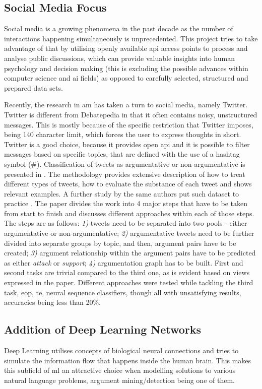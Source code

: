     \subsection{Social Media Focus} \label{socialmedia}
        Social media is a growing phenomena in the past decade as the number of interactions happening simultaneously is unprecedented. This project tries to take advantage of that by utilising openly available \gls{api} access points to process and analyse public discussions, which can provide valuable insights into human psychology and decision making (this is excluding the possible advances within computer science and \gls{ai} fields) as opposed to carefully selected, structured and prepared data sets.
    
        Recently, the research in \gls{am} has taken a turn to social media, namely Twitter. Twitter is different from Debatepedia in that it often contains noisy, unstructured messages. This is mostly because of the specific restriction that Twitter imposes, being 140 character limit, which forces the user to express thoughts in short. Twitter is a good choice, because it provides open \gls{api} and it is possible to filter messages based on specific topics, that are defined with the use of a hashtag symbol (\#). Classification of tweets as argumentative or non-argumentative is presented in \autocite{Bosc2016DARTAD}. The methodology provides extensive description of how to treat different types of tweets, how to evaluate the substance of each tweet and shows relevant examples. A further study by the same authors put such dataset to practice \autocite{Bosc2016TweetiesSP}. The paper divides the work into 4 major steps that have to be taken from start to finish and discusses different approaches within each of those steps. The steps are as follows: \textit{1)} tweets need to be separated into two pools - either argumentative or non-argumentative; \textit{2)} argumentative tweets need to be further divided into separate groups by topic, and then, argument pairs have to be created; \textit{3)} argument relationship within the argument pairs have to be predicted as either \textit{attack} or \textit{support}; \textit{4)} argumentation graph has to be built. First and second tasks are trivial compared to the third one, as is evident based on views expressed in the paper. Different approaches were tested while tackling the third task, \gls{eop}, \gls{te}, neural sequence classifiers, though all with unsatisfying results, accuracies being less than 20\%.
    
    \subsection{Addition of Deep Learning Networks} \label{deeplearning}
        Deep Learning utilises concepts of biological neural connections and tries to simulate the information flow that happens inside the human brain. This makes this subfield of \gls{ml} an attractive choice when modelling solutions to various natural language problems, argument mining/detection being one of them.
        
